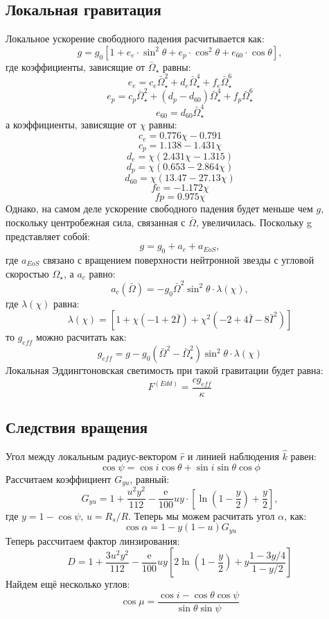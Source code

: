 \subsection{Локальная гравитация}
Локальное ускорение свободного падения расчитывается как:
$$g = g_0 \left[ 1 + e_e \cdot \sin^2\theta + e_p \cdot \cos^2 \theta + e_{60} \cdot \cos \theta \right],$$
где коэффициенты, зависящие от $\bar{\Omega}_{\star}$ равны:
$$e_e = c_e \bar{\Omega}_{\star}^2 + d_e \bar{\Omega}_{\star}^4 + f_e \bar{\Omega}_{\star}^6$$
$$e_p = c_p \bar{\Omega}_{\star}^2 + (d_p - d_{60}) \bar{\Omega}_{\star}^4 + f_p \bar{\Omega}_{\star}^6$$
$$e_{60} = d_{60} \bar{\Omega}_{\star}^4$$
а коэффициенты, зависящие от $\chi$ равны:
$$c_e = 0.776 \chi - 0.791$$
$$c_p = 1.138 - 1.431 \chi$$ 
$$d_e = \chi (2.431 \chi - 1.315) $$
$$d_p = \chi(0.653 - 2.864 \chi)$$
$$d_{60} = \chi (13.47 - 27.13 \chi)$$
$$fe = -1.172 \chi$$
$$fp = 0.975 \chi$$
Однако, на самом деле ускорение свободного падения будет меньше чем $g$, поскольку центробежная сила, связанная с $\bar{\Omega}$, увеличилась.
Поскольку g представляет собой:
$$g = g_0 + a_c + a_{EoS},$$
где $a_{EoS}$ связано с вращением поверхности нейтронной звезды с угловой скоростью $\Omega_{\star}$, а $a_c$ равно:
$$a_c (\bar{\Omega}) = - g_0 \bar{\Omega}^2 \sin^2 \theta \cdot \lambda(\chi),$$
где $\lambda(\chi)$ равна:
$$\lambda(\chi) = \left[1 + \chi(-1 + 2\bar{I}) + \chi^2 (-2 + 4\bar{I} - 8\bar{I}^2)\right]$$
то $g_{eff}$ можно расчитать как: 
$$g_{eff} = g - g_0 (\bar{\Omega}^2 - \bar{\Omega}_{\star}^2 ) \sin^2 \theta \cdot \lambda(\chi)$$
Локальная Эддингтоновская светимость при такой гравитации будет равна:
$$F^{(Edd)} = \frac{cg_{eff}}{\kappa}$$

\subsection{Следствия вращения}
Угол между локальным радиус-вектором $\hat{r}$ и линией наблюдения $\hat{k}$ равен:
$$\cos \psi = \cos i \cos \theta + \sin i  \sin \theta \cos \phi$$
Рассчитаем коэффициент $G_{yu}$, равный:
$$ G_{yu} = 1 + \frac{u^2y^2}{112} -  \frac{\mathrm{e}}{100} uy \cdot \left[\ln \left(1 - \frac{y}{2}\right) + \frac{y}{2}\right],$$
где $y = 1 - \cos \psi$, $u = R_{s}/R$. Теперь мы можем расчитать угол $\alpha$, как:
$$\cos\alpha = 1 - y(1 - u) G_{yu}$$
Теперь рассчитаем фактор линзирования:
$$D = 1 + \frac{3 u^2 y^2}{112} - \frac{\mathrm{e}}{100} uy \left[ 2 \ln\left(1 - \frac{y}{2}\right) + y\frac{1 - 3y/4}{1 - y/2}\right]$$
Найдем ещё несколько углов:
$$\cos \mu = \frac{\cos i - \cos \theta \cos \psi}{\sin \theta \sin \psi} $$

